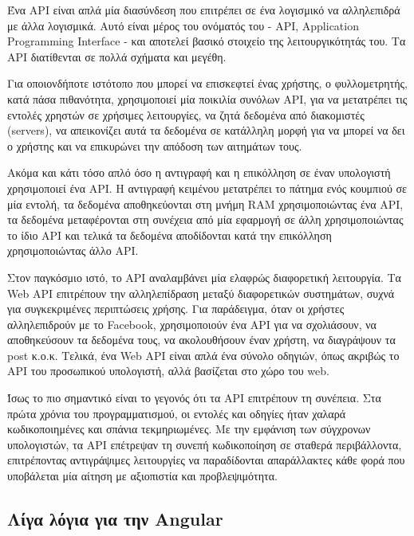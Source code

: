 \documentclass[a4paper,12pt]{article}
\begin{document}
			Ένα API είναι απλά μία διασύνδεση που επιτρέπει σε ένα λογισμικό να αλληλεπιδρά με άλλα λογισμικά. Αυτό είναι μέρος του ονόματός του - API, Application Programming Interface - και 
			αποτελεί βασικό στοιχείο της λειτουργικότητάς του. Τα API διατίθενται σε πολλά σχήματα και μεγέθη.
			
			Για οποιονδήποτε ιστότοπο που μπορεί να επισκεφτεί ένας χρήστης, ο φυλλομετρητής, κατά πάσα πιθανότητα, 
			χρησιμοποιεί μία ποικιλία συνόλων API, για να μετατρέπει τις εντολές χρηστών σε χρήσιμες λειτουργίες, να ζητά δεδομένα από διακομιστές (servers), να απεικονίζει αυτά τα δεδομένα σε 
			κατάλληλη μορφή για να μπορεί να δει ο χρήστης και να επικυρώνει την απόδοση των αιτημάτων τους.
			
			Ακόμα και κάτι τόσο απλό όσο η αντιγραφή και η επικόλληση σε έναν υπολογιστή χρησιμοποιεί ένα API. Η αντιγραφή κειμένου μετατρέπει το πάτημα ενός κουμπιού σε μία εντολή, τα δεδομένα 
			αποθηκεύονται στη μνήμη RAM χρησιμοποιώντας ένα API, τα δεδομένα μεταφέρονται στη συνέχεια από μία εφαρμογή σε άλλη χρησιμοποιώντας το ίδιο API και τελικά τα δεδομένα 
			αποδίδονται κατά την επικόλληση χρησιμοποιώντας άλλο API. 
			
			Στον παγκόσμιο ιστό, το API αναλαμβάνει μία ελαφρώς διαφορετική λειτουργία. Τα Web API επιτρέπουν την αλληλεπίδραση μεταξύ διαφορετικών συστημάτων, συχνά για συγκεκριμένες 
			περιπτώσεις χρήσης. Για παράδειγμα, όταν οι χρήστες αλληλεπιδρούν με το Facebook, χρησιμοποιούν ένα API για να σχολιάσουν, να αποθηκεύσουν τα δεδομένα τους, να ακολουθήσουν έναν 
			χρήστη, να διαγράψουν τα post κ.ο.κ. Τελικά, ένα Web API είναι απλά ένα σύνολο οδηγιών, όπως ακριβώς το API του προσωπικού υπολογιστή, αλλά βασίζεται στο χώρο του web.
			
			Ίσως το πιο σημαντικό είναι το γεγονός ότι τα API επιτρέπουν τη συνέπεια. Στα πρώτα χρόνια του προγραμματισμού, οι εντολές και οδηγίες ήταν χαλαρά κωδικοποιημένες και σπάνια τεκμηριωμένες.   
			Με την εμφάνιση των σύγχρονων υπολογιστών, τα API επέτρεψαν τη συνεπή κωδικοποίηση σε σταθερά περιβάλλοντα, επιτρέποντας αντιγράψιμες λειτουργίες να παραδίδονται απαράλλακτες κάθε φορά που 
			υποβάλεται μία αίτηση με αξιοπιστία και προβλεψιμότητα.
		
		
			
		\newpage
		\subsection{Λίγα λόγια για την Angular}
\end{document}
